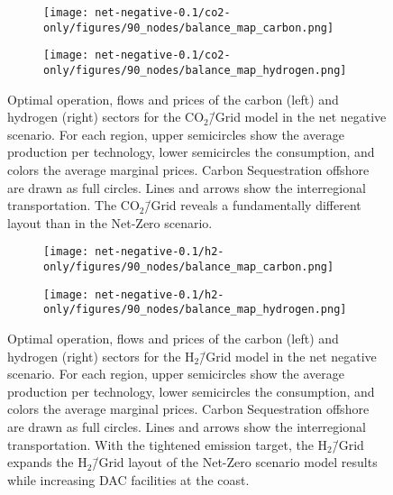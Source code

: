 \documentclass[twocolumn]{article}
\newcommand{\carbongrid}{CO$_2$\=/Grid}
\newcommand{\hydrogengrid}{H$_2$\=/Grid}
\newcommand{\carbonmodel}{CO$_2$\=/Grid model}
\newcommand{\hydrogenmodel}{H$_2$\=/Grid model}
\begin{document}
\begin{figure}[ht!]
    \centering
    \begin{subfigure}{.5\textwidth}
        \centering
        \texttt{[image: net-negative-0.1/co2-only/figures/90\_nodes/balance\_map\_carbon.png]}
        \label{fig:balance_map_carbon_co2_nn}
    \end{subfigure}%
    \begin{subfigure}{.5\textwidth}
        \centering
        \texttt{[image: net-negative-0.1/co2-only/figures/90\_nodes/balance\_map\_hydrogen.png]}
        \label{fig:balance_map_hydrogen_co2_nn}
    \end{subfigure}
    \caption{Optimal operation, flows and prices of the carbon (left) and hydrogen (right) sectors for the \carbonmodel{} in the net negative scenario. For each region, upper semicircles show the average production per technology, lower semicircles the consumption, and colors the average marginal prices. Carbon Sequestration offshore are drawn as full circles. Lines and arrows show the interregional transportation. The \carbongrid{} reveals a fundamentally different layout than in the Net-Zero scenario.
    }
    \label{fig:balance_maps_co2_nn}
\end{figure}

\begin{figure}[ht!]
    \centering
    \begin{subfigure}{.5\textwidth}
        \centering
        \texttt{[image: net-negative-0.1/h2-only/figures/90\_nodes/balance\_map\_carbon.png]}
        \label{fig:balance_map_carbon_h2_nn}
    \end{subfigure}%
    \begin{subfigure}{.5\textwidth}
        \centering
        \texttt{[image: net-negative-0.1/h2-only/figures/90\_nodes/balance\_map\_hydrogen.png]}
        \label{fig:balance_map_hydrogen_h2_nn}
    \end{subfigure}
    \caption{Optimal operation, flows and prices of the carbon (left) and hydrogen (right) sectors for the \hydrogenmodel{} in the net negative scenario. For each region, upper semicircles show the average production per technology, lower semicircles the consumption, and colors the average marginal prices. Carbon Sequestration offshore are drawn as full circles. Lines and arrows show the interregional transportation. With the tightened emission target, the \hydrogengrid{} expands the \hydrogengrid{} layout of the Net-Zero scenario model results while increasing DAC facilities at the coast.
    }
    \label{fig:balance_maps_h2_nn}
\end{figure}
\end{document}
